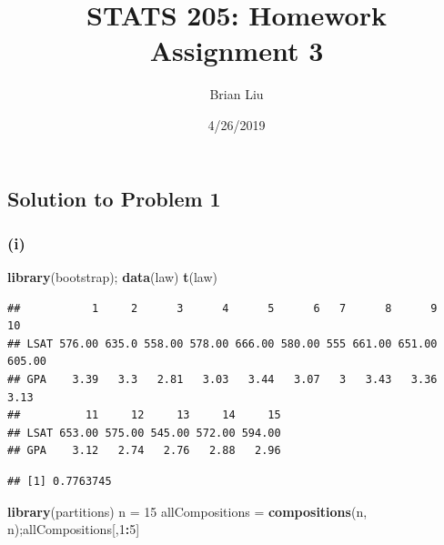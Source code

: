\documentclass[]{article}
\title{STATS 205: Homework Assignment 3}
\author{Brian Liu}
\date{4/26/2019}
\newenvironment{Shaded}{\begin{snugshade}}{\end{snugshade}}
\newcommand{\DecValTok}[1]{\textcolor[rgb]{0.00,0.00,0.81}{#1}}
\newcommand{\KeywordTok}[1]{\textcolor[rgb]{0.13,0.29,0.53}{\textbf{#1}}}
\newcommand{\NormalTok}[1]{#1}
\newcommand{\OperatorTok}[1]{\textcolor[rgb]{0.81,0.36,0.00}{\textbf{#1}}}
\newcommand{\StringTok}[1]{\textcolor[rgb]{0.31,0.60,0.02}{#1}}
\begin{document}
\maketitle

\hypertarget{solution-to-problem-1}{%
\subsection{Solution to Problem 1}\label{solution-to-problem-1}}

\hypertarget{i}{%
\subsubsection{(i)}\label{i}}

\begin{Shaded}
\begin{Highlighting}[]
\KeywordTok{library}\NormalTok{(bootstrap); }\KeywordTok{data}\NormalTok{(law)}
\KeywordTok{t}\NormalTok{(law)}
\end{Highlighting}
\end{Shaded}

\begin{verbatim}
##           1     2      3      4      5      6   7      8      9     10
## LSAT 576.00 635.0 558.00 578.00 666.00 580.00 555 661.00 651.00 605.00
## GPA    3.39   3.3   2.81   3.03   3.44   3.07   3   3.43   3.36   3.13
##          11     12     13     14     15
## LSAT 653.00 575.00 545.00 572.00 594.00
## GPA    3.12   2.74   2.76   2.88   2.96
\end{verbatim}

\begin{Shaded}
\end{Shaded}

\begin{verbatim}
## [1] 0.7763745
\end{verbatim}

\begin{Shaded}
\begin{Highlighting}[]
\KeywordTok{library}\NormalTok{(partitions)}
\NormalTok{n =}\StringTok{ }\DecValTok{15}
\NormalTok{allCompositions =}\StringTok{ }\KeywordTok{compositions}\NormalTok{(n, n);allCompositions[,}\DecValTok{1}\OperatorTok{:}\DecValTok{5}\NormalTok{]}
\end{Highlighting}
\end{Shaded}
\end{document}
